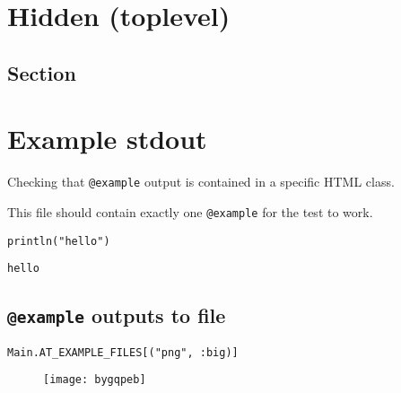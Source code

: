 \chapter{Hidden (toplevel)}



\label{6313475699066143527}{}


\section{Section}



\label{17839007067547789498}{}


\chapter{Example stdout}



\label{5127638645760162431}{}


Checking that \texttt{@example} output is contained in a specific HTML class.



\begin{tcolorbox}[toptitle=-1mm,bottomtitle=1mm,colback=admonition-warning!50!white,colframe=admonition-warning,title=\textbf{Warning}]
This file should contain exactly one \texttt{@example} for the test to work.

\end{tcolorbox}



\begin{lstlisting}[]
println("hello")
\end{lstlisting}


\begin{lstlisting}[]
hello
\end{lstlisting}



\section{\texttt{@example} outputs to file}



\label{16032070393363005082}{}



\begin{lstlisting}[]
Main.AT_EXAMPLE_FILES[("png", :big)]
\end{lstlisting}

\begin{figure}[H]
\centering
\texttt{[image: bygqpeb]}
\end{figure}





